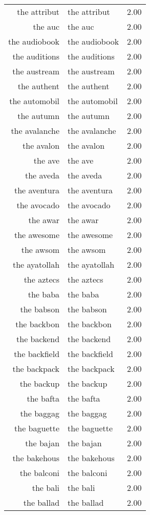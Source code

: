 \begin{table}[ht]
\begin{tabular}{rlr}
  the attribut & the attribut & 2.00 \\ 
  the auc & the auc & 2.00 \\ 
  the audiobook & the audiobook & 2.00 \\ 
  the auditions & the auditions & 2.00 \\ 
  the austream & the austream & 2.00 \\ 
  the authent & the authent & 2.00 \\ 
  the automobil & the automobil & 2.00 \\ 
  the autumn & the autumn & 2.00 \\ 
  the avalanche & the avalanche & 2.00 \\ 
  the avalon & the avalon & 2.00 \\ 
  the ave & the ave & 2.00 \\ 
  the aveda & the aveda & 2.00 \\ 
  the aventura & the aventura & 2.00 \\ 
  the avocado & the avocado & 2.00 \\ 
  the awar & the awar & 2.00 \\ 
  the awesome & the awesome & 2.00 \\ 
  the awsom & the awsom & 2.00 \\ 
  the ayatollah & the ayatollah & 2.00 \\ 
  the aztecs & the aztecs & 2.00 \\ 
  the baba & the baba & 2.00 \\ 
  the babson & the babson & 2.00 \\ 
  the backbon & the backbon & 2.00 \\ 
  the backend & the backend & 2.00 \\ 
  the backfield & the backfield & 2.00 \\ 
  the backpack & the backpack & 2.00 \\ 
  the backup & the backup & 2.00 \\ 
  the bafta & the bafta & 2.00 \\ 
  the baggag & the baggag & 2.00 \\ 
  the baguette & the baguette & 2.00 \\ 
  the bajan & the bajan & 2.00 \\ 
  the bakehous & the bakehous & 2.00 \\ 
  the balconi & the balconi & 2.00 \\ 
  the bali & the bali & 2.00 \\ 
  the ballad & the ballad & 2.00 \\ 

\end{tabular}
\end{table}

